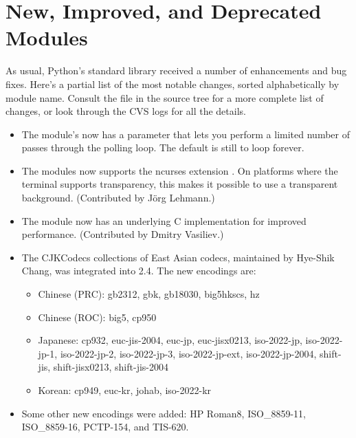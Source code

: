 \documentclass{howto}
\begin{document}
\section{New, Improved, and Deprecated Modules}

As usual, Python's standard library received a number of enhancements and
bug fixes.  Here's a partial list of the most notable changes, sorted
alphabetically by module name. Consult the
 file in the source tree for a more
complete list of changes, or look through the CVS logs for all the
details.

\begin{itemize}


\item The  module's  now has a 
    parameter that lets you perform a limited number 
   of passes through the polling loop.  The default is still to loop
   forever.

\item The  modules now supports the ncurses extension 
   .  On platforms where the terminal
   supports transparency, this makes it possible to use a transparent
   background.  (Contributed by J\"org Lehmann.)

\item The  module now has an underlying C implementation
   for improved performance.
   (Contributed by Dmitry Vasiliev.)

\item The CJKCodecs collections of East Asian codecs, maintained
by Hye-Shik Chang, was integrated into 2.4.  
The new encodings are:

\begin{itemize}
 \item Chinese (PRC): gb2312, gbk, gb18030, big5hkscs, hz
 \item Chinese (ROC): big5, cp950
 \item Japanese: cp932, euc-jis-2004, euc-jp,
euc-jisx0213, iso-2022-jp, iso-2022-jp-1, iso-2022-jp-2,
 iso-2022-jp-3, iso-2022-jp-ext, iso-2022-jp-2004,
 shift-jis, shift-jisx0213, shift-jis-2004
 \item Korean: cp949, euc-kr, johab, iso-2022-kr
\end{itemize} 

\item Some other new encodings were added: HP Roman8, 
ISO_8859-11, ISO_8859-16, PCTP-154, 
and TIS-620.


\end{itemize}
\end{document}
